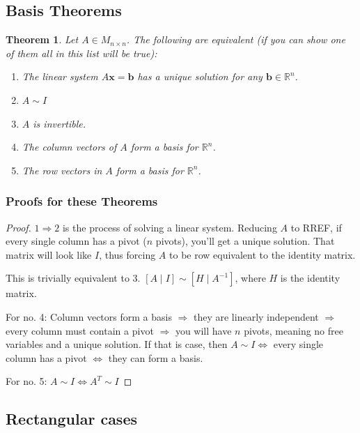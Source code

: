 \documentclass[12pt]{article}
\theoremstyle{plain}
\newtheorem{theorem}{Theorem}[section]
\theoremstyle{remark}
\theoremstyle{definition}
\begin{document}
\subsection{Basis Theorems}

\begin{theorem}
Let \(A \in M_{n \times n}\). The following are
equivalent (if you can show one of them all in this list will be true):

\begin{enumerate}
\def\labelenumi{\arabic{enumi}.}
\item
  The linear system \(A\mathbf{x} = \mathbf{b}\) has a unique
  solution for any \(\mathbf{b} \in \mathbb{R}^{n}\).
\item
  \(A\sim I\)
\item
  \(A\) is invertible.
\item
  The column vectors of \(A\) form a basis for \(\mathbb{R}^{n}\).
\item
  The row vectors in \(A\) form a basis for \(\mathbb{R}^{n}\).
\end{enumerate}
\end{theorem}


\subsubsection{Proofs for these
Theorems}

\begin{proof} \(1 \Rightarrow 2\) is the process of solving a linear
system. Reducing \(A\) to RREF, if every single column has a pivot
(\(n\) pivots), you'll get a unique solution. That matrix will look like
\(I\), thus forcing \(A\) to be row equivalent to the identity matrix.

This is trivially equivalent to \(3\).
\(\left\lbrack A\mid I \right\rbrack\sim\left\lbrack H\mid A^{- 1} \right\rbrack\),
where \(H\) is the identity matrix.

For no. 4: Column vectors form a basis \(\Rightarrow\) they are linearly
independent \(\Rightarrow\) every column must contain a pivot
\(\Rightarrow\) you will have \(n\) pivots, meaning no free variables
and a unique solution. If that is case, then \(A\sim I \Leftrightarrow\)
every single column has a pivot \(\Leftrightarrow\) they can form a
basis.

For no. 5: \(A\sim I \Leftrightarrow A^{T}\sim I\)



\end{proof}
\subsection{Rectangular cases}
\end{document}
